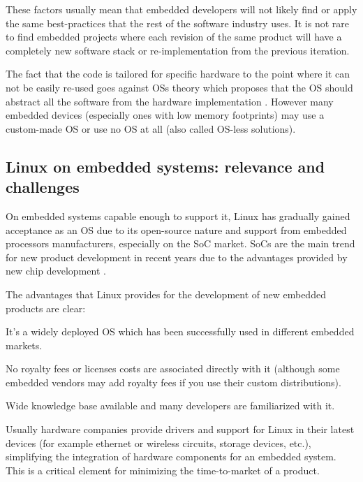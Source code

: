 These factors usually mean that embedded developers will not likely find or apply the same best-practices that the rest of the software industry uses. It is not rare to find embedded projects where each revision of the same product will have a completely new software stack or re-implementation from the previous iteration.

The fact that the code is tailored for specific hardware to the point where it can not be easily re-used goes against \acp{OS} theory which proposes that the \ac{OS} should abstract all the software from the hardware implementation \citep[p.~29]{Silberschatz:2010vn}. However many embedded devices (especially ones with low memory footprints) may use a custom-made \ac{OS} or use no \ac{OS} at all (also called \ac{OS}-less solutions).

\subsection{Linux on embedded systems: relevance and challenges}
On embedded systems capable enough to support it, Linux has gradually gained acceptance as an \ac{OS} due to its open-source nature and support from embedded processors manufacturers, especially on the \ac{SoC} market. \acp{SoC} are the main trend for new product development in recent years due to the advantages provided by new chip development \citep{Somaya:2000fk}.

The advantages that Linux provides for the development of new embedded products  are clear:
\begin{itemize*}
\item It's a widely deployed \ac{OS} which has been successfully used in different embedded markets.
\item No royalty fees or licenses costs are associated directly with it (although some embedded vendors may add royalty fees if you use their custom distributions).
\item Wide knowledge base available and many developers are familiarized with it.
\item Usually hardware companies provide drivers and support for Linux in their latest devices (for example ethernet or wireless circuits, storage devices, etc.), simplifying the integration of hardware components for an embedded system. This is a critical element for minimizing the time-to-market of a product.
\end{itemize*}

